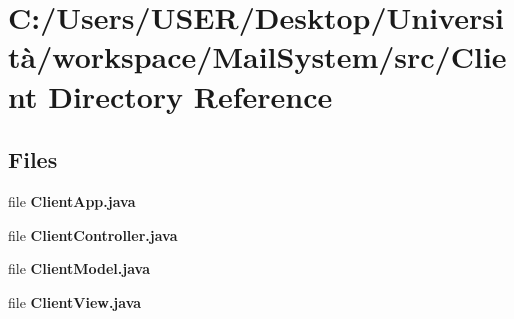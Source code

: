 \section{C\+:/\+Users/\+U\+S\+E\+R/\+Desktop/\+Università/workspace/\+Mail\+System/src/\+Client Directory Reference}
\label{dir_f1cadacc1c34bdb443576f7a7e4cdba5}
\subsection*{Files}
\begin{DoxyCompactItemize}
\item 
file \textbf{ Client\+App.\+java}
\item 
file \textbf{ Client\+Controller.\+java}
\item 
file \textbf{ Client\+Model.\+java}
\item 
file \textbf{ Client\+View.\+java}
\end{DoxyCompactItemize}
